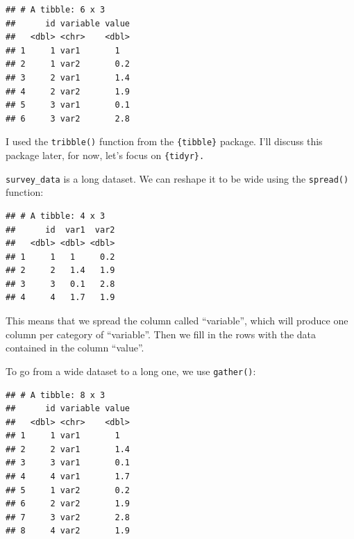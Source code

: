 \documentclass[]{gitbook}
\newenvironment{Shaded}{\begin{snugshade}}{\end{snugshade}}
\newcommand{\KeywordTok}[1]{\textcolor[rgb]{0.13,0.29,0.53}{\textbf{#1}}}
\newcommand{\NormalTok}[1]{#1}
\newcommand{\OperatorTok}[1]{\textcolor[rgb]{0.81,0.36,0.00}{\textbf{#1}}}
\newcommand{\StringTok}[1]{\textcolor[rgb]{0.31,0.60,0.02}{#1}}
\theoremstyle{definition}
\theoremstyle{definition}
\theoremstyle{definition}
\theoremstyle{remark}
\begin{document}
\begin{verbatim}
## # A tibble: 6 x 3
##      id variable value
##   <dbl> <chr>    <dbl>
## 1     1 var1       1  
## 2     1 var2       0.2
## 3     2 var1       1.4
## 4     2 var2       1.9
## 5     3 var1       0.1
## 6     3 var2       2.8
\end{verbatim}

I used the \texttt{tribble()} function from the \texttt{\{tibble\}}
package. I'll discuss this package later, for now, let's focus on
\texttt{\{tidyr\}.}

\texttt{survey\_data} is a long dataset. We can reshape it to be wide
using the \texttt{spread()} function:

\begin{Shaded}
\end{Shaded}

\begin{verbatim}
## # A tibble: 4 x 3
##      id  var1  var2
##   <dbl> <dbl> <dbl>
## 1     1   1     0.2
## 2     2   1.4   1.9
## 3     3   0.1   2.8
## 4     4   1.7   1.9
\end{verbatim}

This means that we spread the column called ``variable'', which will
produce one column per category of ``variable''. Then we fill in the
rows with the data contained in the column ``value''.

To go from a wide dataset to a long one, we use \texttt{gather()}:

\begin{Shaded}
\end{Shaded}

\begin{verbatim}
## # A tibble: 8 x 3
##      id variable value
##   <dbl> <chr>    <dbl>
## 1     1 var1       1  
## 2     2 var1       1.4
## 3     3 var1       0.1
## 4     4 var1       1.7
## 5     1 var2       0.2
## 6     2 var2       1.9
## 7     3 var2       2.8
## 8     4 var2       1.9
\end{verbatim}
\end{document}
